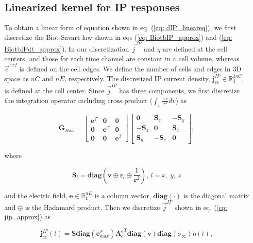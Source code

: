 \documentclass[extra,mreferee]{gji}
\newcommand{\siginf}{\sigma_\infty}
\newcommand{\Ace}{{\mathbf A_c^e}}
\newcommand{\diag}{\mathbf{diag}}
\renewcommand {\j}  { {\vec j} }
\newcommand {\e}  { {\vec e} }
\renewcommand {\dj}  { {\mathbf{j} } }
\newcommand {\de}  { {\mathbf{e} } }
\newcommand{\vol}{\mathbf{v}}
\newcommand{\peta}{\tilde{\eta}}
\newcommand{\eref}{\e^{\ ref}}
\begin{document}
\subsection{Linearized kernel for IP responses}
\label{section:linearkernel_discrete}
To obtain a linear form of equation shown in eq. (\ref{eq: dIP_lineareq}),
we first discretize  the Biot-Savart law shown in eqs (\ref{eq: BiotbIP_approx}) and (\ref{eq: BiotbIPdt_approx}). In our discretization $\j^{IP}$ and  $\peta$ are defined at the cell centers, and those for each time channel are constant in a cell volume, whereas $\eref$ is defined on the cell edges. 
We define the number of cells and edges in 3D space as $nC$ and $nE$, respectively. The discretized IP current density, $\dj^{IP}_{cc} \in \mathbb{R}^{3nC}_{1}$, is defined at the cell center. Since $\j^{IP}$ has three components, we first discretize the integration operator including cross product ($\int_{v}\frac{ \times \hat{r}}{r^2}dv$) as
\begin{linenomath*}
\begin{equation}
  \mathbf{G}_{Biot} =
  \begin{bmatrix}
       \mathbf{e}^T &  \mathbf{0}   & \mathbf{0}  \\
       \mathbf{0}   &  \mathbf{e}^T & \mathbf{0}  \\
       \mathbf{0}   &  \mathbf{0}   & \mathbf{e}^T
    \end{bmatrix}
  \begin{bmatrix}
       \mathbf{0}     &   \mathbf{S}_z   & -\mathbf{S}_y  \\
      -\mathbf{S}_z   &   \mathbf{0}     &  \mathbf{S}_x  \\
       \mathbf{S}_y   &  -\mathbf{S}_x   &  \mathbf{0}
    \end{bmatrix},
\end{equation}
\end{linenomath*}
where
\begin{linenomath*}
\begin{equation*}
  \mathbf{S}_l =\diag(\mathbf{v}\oplus \mathbf{r}_l \oplus \frac{1}{\mathbf{r}^2}), \ l = x, \ y, \ z
\end{equation*}
\end{linenomath*}
and the electric field, $\mathbf{e} \in \mathbb{R}^{nE}_1$ is a column vector, $\diag(\cdot)$ is the diagonal matrix and $\oplus$ is the Hadamard product. 
Then we discretize $\j^{IP}$ shown in eq. (\ref{eq: jip_approx}) as
\begin{linenomath*}
\begin{equation}
  \dj^{IP}_{cc}(t) = \mathbf{S}\diag(\de^{F}_{max})\Ace^T\diag(\vol)\diag(\siginf)\peta(t),
\end{equation}
\end{linenomath*}
\end{document}
